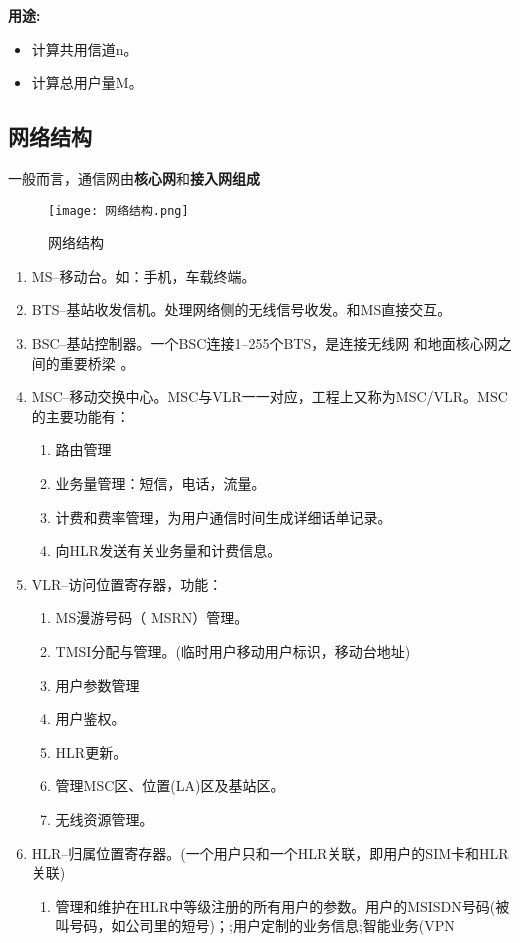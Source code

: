 	 \textbf{用途:}\\
	 \begin{itemize}
	 	\item 计算共用信道n。
	 	\item 计算总用户量M。
	 \end{itemize}
	\subsection{网络结构}
	一般而言，通信网由\textbf{核心网}和\textbf{接入网组成}
	\begin{figure}[H]
		\centering
		\texttt{[image: 网络结构.png]}
		\caption{网络结构}
	\end{figure}
	\begin{enumerate}
		\item MS--移动台。如：手机，车载终端。
		\item BTS--基站收发信机。处理网络侧的无线信号收发。和MS直接交互。
		\item BSC--基站控制器。一个BSC连接1--255个BTS，是连接无线网
		和地面核心网之间的重要桥梁
		。
		\item MSC--移动交换中心。MSC与VLR一一对应，工程上又称为MSC/VLR。MSC的主要功能有：
		\begin{enumerate}
			\item 路由管理
			\item 业务量管理：短信，电话，流量。
			\item 计费和费率管理，为用户通信时间生成详细话单记录。
			\item 向HLR发送有关业务量和计费信息。
		\end{enumerate}
		\item VLR--访问位置寄存器，功能：
		\begin{enumerate}
			\item MS漫游号码（ MSRN）管理。
			\item TMSI分配与管理。(临时用户移动用户标识，移动台地址)
			\item 用户参数管理
			\item 用户鉴权。
			\item HLR更新。
			\item 管理MSC区、位置(LA)区及基站区。
			\item 无线资源管理。
		\end{enumerate}
		\item HLR--归属位置寄存器。(一个用户只和一个HLR关联，即用户的SIM卡和HLR关联)
		\begin{enumerate}
			\item 管理和维护在HLR中等级注册的所有用户的参数。用户的MSISDN号码(被叫号码，如公司里的短号)；;用户定制的业务信息;智能业务(VPN

\end{enumerate}
\end{enumerate}

